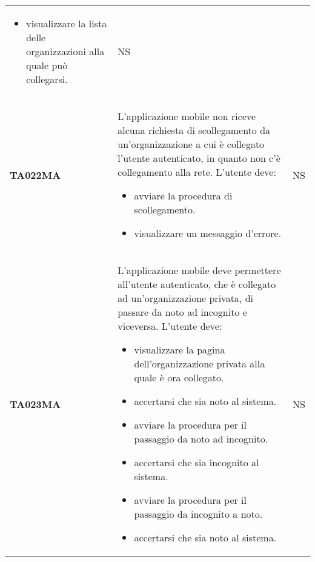 \documentclass[../piano-di-qualifica.tex]{subfiles}
\begin{document}
\begin{longtable}[H]{>{\centering\bfseries}m{3cm} >{}m{10cm} >{\centering\arraybackslash}m{3cm}}
\begin{itemize}
    \item visualizzare la lista delle organizzazioni alla quale può collegarsi.
  \end{itemize}
                    & NS                                                                                                                                                                                                                                                               \\
  TA022MA           & L'applicazione mobile non riceve alcuna richiesta di scollegamento da un'organizzazione a cui è collegato l'utente autenticato, in quanto non c'è collegamento alla rete. \newline
  L'utente deve:
  \begin{itemize}
    \item avviare la procedura di scollegamento.
    \item visualizzare un messaggio d'errore.
  \end{itemize}
                    & NS                                                                                                                                                                                                                                                               \\
  TA023MA           & L'applicazione mobile deve permettere all'utente autenticato, che è collegato ad un'organizzazione privata, di passare da noto ad incognito e viceversa. \newline
  L'utente deve:
  \begin{itemize}
    \item visualizzare la pagina dell'organizzazione privata alla quale è ora collegato.
    \item accertarsi che sia noto al sistema.
    \item avviare la procedura per il passaggio da noto ad incognito.
    \item accertarsi che sia incognito al sistema.
    \item avviare la procedura per il passaggio da incognito a noto.
    \item accertarsi che sia noto al sistema.
  \end{itemize}
                    & NS                                                                                                                                                                                                                                                               \\

\end{longtable}
\end{document}
